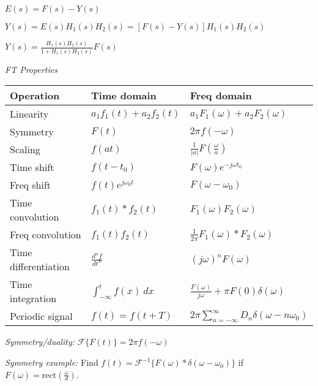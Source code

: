 \documentclass[twocolumn]{article}
\begin{document}
$E(s) = F(s) - Y(s)$

$Y(s) = E(s) H_1(s) H_2(s) = [F(s) - Y(s)] H_1(s) H_2(s)$

$Y(s) = \frac{H_1(s) H_2(s)}{1+H_1(s)H_2(s)} F(s)$


\cleardoublepage


\onecolumn

\begin{table}[h!]
    \centering
    \textit{FT Properties} \\[1em]

    \begin{tabular}{lll}
        \toprule
        Operation & Time domain & Freq domain \\
        \midrule
        Linearity & $a_1 f_1(t) + a_2 f_2(t)$ & $a_1 F_1(\omega) + a_2 F_2(\omega)$ \\[0.5em]
        Symmetry & $F(t)$ & $2\pi f(-\omega)$ \\[0.5em]
        Scaling & $f(at)$ & $\frac{1}{|a|} F \left( \frac{\omega}{a} \right)$ \\[1.25em]
        Time shift & $f(t-t_0)$ & $F(\omega) e^{-j\omega t_0}$ \\[0.5em]
        Freq shift & $f(t) e^{j \omega_0 t}$ & $F(\omega - \omega_0)$ \\[0.5em]
        Time convolution & $f_1(t) * f_2(t)$ & $F_1(\omega) F_2(\omega)$ \\[0.5em]
        Freq convolution & $f_1(t) f_2(t)$ & $\frac{1}{2\pi} F_1(\omega) * F_2(\omega)$ \\[0.5em]
        Time differentiation & $\frac{d^n f}{dt^n}$ & $(j\omega)^n F(\omega)$ \\[1em]
        Time integration & $\int_{-\infty}^t f(x)\ dx$ & $\frac{F(\omega)}{j\omega} + \pi F(0) \delta(\omega)$ \\[1em]
        Periodic signal & $f(t) = f(t+T)$ & $2\pi \sum_{n=-\infty}^\infty D_n \delta(\omega - n\omega_0)$ \\[1em]
        \bottomrule
    \end{tabular}
\end{table}

\textit{Symmetry/duality:} $\mathcal{F} \{ F(t) \} = 2\pi f(-\omega)$

\textit{Symmetry example:} Find $f(t) = \mathcal{F}^{-1} \{ F(\omega) * \delta(\omega-\omega_0) \}$ if $F(\omega) = \text{rect}\left(\frac{\omega}{d}\right)$.
\end{document}
